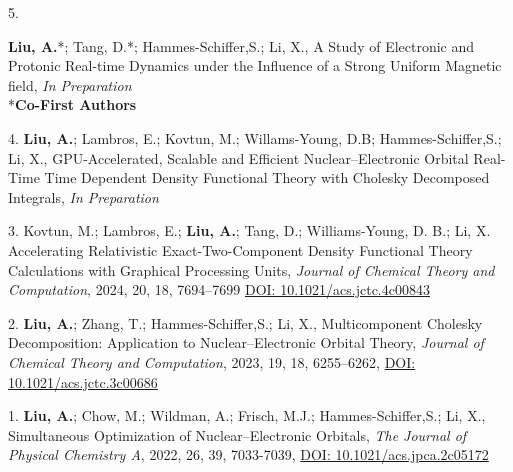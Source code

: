 


\begin{cvpublications}


\cvpublication
{5.}
{\parbox[t]{0.95\textwidth}{\strut \textbf{Liu, A.}*; Tang, D.*; Hammes-Schiffer,S.; Li, X., 
A Study of Electronic and Protonic Real-time Dynamics under the Influence of a Strong Uniform Magnetic field,
\textit{In Preparation}\\ 
\**\textbf{Co-First Authors}}}

\cvpublication
{4.} 
{\textbf{Liu, A.}; Lambros, E.; Kovtun, M.; Willams-Young, D.B; Hammes-Schiffer,S.; Li, X., 
GPU-Accelerated, Scalable and Efficient Nuclear–Electronic Orbital Real-Time Time Dependent Density Functional
Theory with Cholesky Decomposed Integrals, 
\textit{In Preparation}}

\cvpublication
{3.} 
{Kovtun, M.; Lambros, E.; \textbf{Liu, A.}; Tang, D.; Williams-Young, D. B.; Li, X. Accelerating Relativistic Exact-Two-Component Density Functional Theory Calculations with Graphical Processing Units,
\textit{Journal of Chemical Theory and Computation}, 2024, 20, 18, 7694–7699
\href{https://doi.org/10.1021/acs.jctc.4c00843}{DOI: 10.1021/acs.jctc.4c00843}}


\cvpublication
{2.} 
{\textbf{Liu, A.}; Zhang, T.; Hammes-Schiffer,S.; Li, X., 
Multicomponent Cholesky Decomposition: Application to Nuclear–Electronic Orbital Theory, 
\textit{Journal of Chemical Theory and Computation}, 2023, 19, 18, 6255–6262, 
\href{https://pubs.acs.org/doi/10.1021/acs.jctc.3c00686}{DOI: 10.1021/acs.jctc.3c00686}}


\cvpublication
{1.} 
{\textbf{Liu, A.}; Chow, M.; Wildman, A.; Frisch, M.J.; Hammes-Schiffer,S.; Li, X., 
Simultaneous Optimization of Nuclear–Electronic Orbitals,  
\textit{The Journal of Physical Chemistry A}, 2022, 26, 39, 7033-7039, 
\href{https://pubs.acs.org/doi/10.1021/acs.jpca.2c05172}{DOI: 10.1021/acs.jpca.2c05172}} 
 





\end{cvpublications}
\vspace{-1cm}

